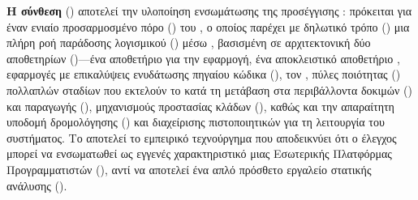 \textbf{Η σύνθεση } () αποτελεί την υλοποίηση ενσωμάτωσης της προσέγγισης : πρόκειται για έναν ενιαίο προσαρμοσμένο πόρο () του , ο οποίος παρέχει με δηλωτικό τρόπο () μια πλήρη ροή παράδοσης λογισμικού () μέσω , βασισμένη σε αρχιτεκτονική δύο αποθετηρίων ()---ένα αποθετήριο για την εφαρμογή, ένα αποκλειστικό αποθετήριο , εφαρμογές  με επικαλύψεις ενυδάτωσης πηγαίου κώδικα (), τον , πύλες ποιότητας () πολλαπλών σταδίων που εκτελούν το  κατά τη μετάβαση στα περιβάλλοντα δοκιμών () και παραγωγής (), μηχανισμούς προστασίας κλάδων (), καθώς και την απαραίτητη υποδομή δρομολόγησης () και διαχείρισης πιστοποιητικών για τη λειτουργία του συστήματος. Το  αποτελεί το εμπειρικό τεχνούργημα που αποδεικνύει ότι ο έλεγχος  μπορεί να ενσωματωθεί ως εγγενές χαρακτηριστικό μιας Εσωτερικής Πλατφόρμας Προγραμματιστών (), αντί να αποτελεί ένα απλό πρόσθετο εργαλείο στατικής ανάλυσης ().

